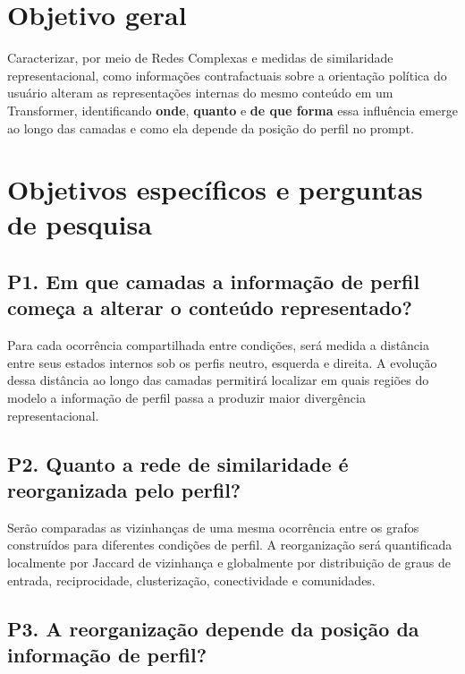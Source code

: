 \documentclass[11pt,a4paper]{article}
\begin{document}
\section{Objetivo geral}

Caracterizar, por meio de Redes Complexas e medidas de similaridade representacional, como informações contrafactuais sobre a orientação política do usuário alteram as representações internas do mesmo conteúdo em um Transformer, identificando \textbf{onde}, \textbf{quanto} e \textbf{de que forma} essa influência emerge ao longo das camadas e como ela depende da posição do perfil no prompt.

\section{Objetivos específicos e perguntas de pesquisa}

\subsection*{P1. Em que camadas a informação de perfil começa a alterar o conteúdo representado?}

Para cada ocorrência compartilhada entre condições, será medida a distância entre seus estados internos sob os perfis neutro, esquerda e direita. A evolução dessa distância ao longo das camadas permitirá localizar em quais regiões do modelo a informação de perfil passa a produzir maior divergência representacional.

\subsection*{P2. Quanto a rede de similaridade é reorganizada pelo perfil?}

Serão comparadas as vizinhanças de uma mesma ocorrência entre os grafos construídos para diferentes condições de perfil. A reorganização será quantificada localmente por Jaccard de vizinhança e globalmente por distribuição de graus de entrada, reciprocidade, clusterização, conectividade e comunidades.

\subsection*{P3. A reorganização depende da posição da informação de perfil?}
\end{document}
